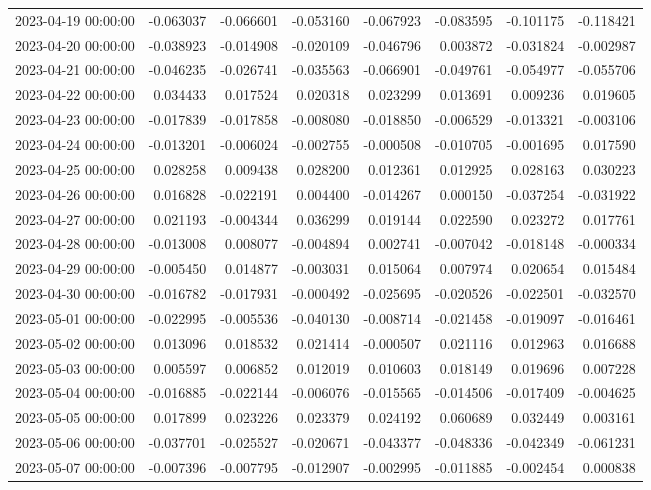 \begin{tabular}{lrrrrrrr}
2023-04-19 00:00:00 & -0.063037 & -0.066601 & -0.053160 & -0.067923 & -0.083595 & -0.101175 & -0.118421 \\
2023-04-20 00:00:00 & -0.038923 & -0.014908 & -0.020109 & -0.046796 & 0.003872 & -0.031824 & -0.002987 \\
2023-04-21 00:00:00 & -0.046235 & -0.026741 & -0.035563 & -0.066901 & -0.049761 & -0.054977 & -0.055706 \\
2023-04-22 00:00:00 & 0.034433 & 0.017524 & 0.020318 & 0.023299 & 0.013691 & 0.009236 & 0.019605 \\
2023-04-23 00:00:00 & -0.017839 & -0.017858 & -0.008080 & -0.018850 & -0.006529 & -0.013321 & -0.003106 \\
2023-04-24 00:00:00 & -0.013201 & -0.006024 & -0.002755 & -0.000508 & -0.010705 & -0.001695 & 0.017590 \\
2023-04-25 00:00:00 & 0.028258 & 0.009438 & 0.028200 & 0.012361 & 0.012925 & 0.028163 & 0.030223 \\
2023-04-26 00:00:00 & 0.016828 & -0.022191 & 0.004400 & -0.014267 & 0.000150 & -0.037254 & -0.031922 \\
2023-04-27 00:00:00 & 0.021193 & -0.004344 & 0.036299 & 0.019144 & 0.022590 & 0.023272 & 0.017761 \\
2023-04-28 00:00:00 & -0.013008 & 0.008077 & -0.004894 & 0.002741 & -0.007042 & -0.018148 & -0.000334 \\
2023-04-29 00:00:00 & -0.005450 & 0.014877 & -0.003031 & 0.015064 & 0.007974 & 0.020654 & 0.015484 \\
2023-04-30 00:00:00 & -0.016782 & -0.017931 & -0.000492 & -0.025695 & -0.020526 & -0.022501 & -0.032570 \\
2023-05-01 00:00:00 & -0.022995 & -0.005536 & -0.040130 & -0.008714 & -0.021458 & -0.019097 & -0.016461 \\
2023-05-02 00:00:00 & 0.013096 & 0.018532 & 0.021414 & -0.000507 & 0.021116 & 0.012963 & 0.016688 \\
2023-05-03 00:00:00 & 0.005597 & 0.006852 & 0.012019 & 0.010603 & 0.018149 & 0.019696 & 0.007228 \\
2023-05-04 00:00:00 & -0.016885 & -0.022144 & -0.006076 & -0.015565 & -0.014506 & -0.017409 & -0.004625 \\
2023-05-05 00:00:00 & 0.017899 & 0.023226 & 0.023379 & 0.024192 & 0.060689 & 0.032449 & 0.003161 \\
2023-05-06 00:00:00 & -0.037701 & -0.025527 & -0.020671 & -0.043377 & -0.048336 & -0.042349 & -0.061231 \\
2023-05-07 00:00:00 & -0.007396 & -0.007795 & -0.012907 & -0.002995 & -0.011885 & -0.002454 & 0.000838 \\

\end{tabular}
